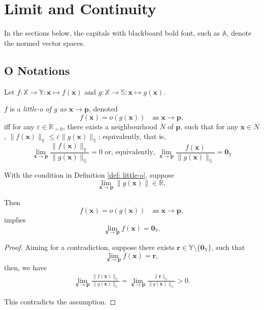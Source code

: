 


\chapter{Limit and Continuity}


In the sections below, the capitals with blackboard bold font, such as $\mathbb A$, denote the normed vector spaces.


\section{O Notations}


\begin{definition}
	\label{def: little-o}
	Let $f: \mathbb X \to \mathbb Y: \mathbf x \mapsto f(\mathbf x)$ and $g: \mathbb X \to \mathbb S: \mathbf x \mapsto g(\mathbf x)$.
	
	$f$ is a \textit{little-o of $g$ as $\mathbf x \to \mathbf p$}, denoted
	$$
	f(\mathbf x) = o(g(\mathbf x)) \quad \text{as $\mathbf x \to \mathbf p$},
	$$
	iff for any $\varepsilon \in \mathbb R_{> 0}$, there exists a neighbourhood $N$ of $\mathbf p$, such that for any $\mathbf x \in N$, $\| f(\mathbf x) \|_{\mathbb Y} \le \varepsilon \| g (\mathbf x)\|_{\mathbb S}$; equivalently, that is,
	$$
	\lim_{\mathbf x \to \mathbf p} \frac{\|f(\mathbf x)\|_{\mathbb Y}}{\| g(\mathbf x) \|_{\mathbb S}} = 0 \text{ or, equivalently, } \lim_{\mathbf x \to \mathbf p} \frac{f(\mathbf x)}{\| g(\mathbf x) \|_{\mathbb S}} = \mathbf 0_{\mathbb Y}
	$$
\end{definition}


\begin{lemma}
	\label{lm: little-o: zero limit}
	With the condition in Definition \ref{def: little-o}, suppose
	$$
	\lim_{\mathbf x \to \mathbf p} \| g(\mathbf x) \| \in \mathbb R,
	$$
	
	Then
	$$
	f(\mathbf x) = o(g(\mathbf x)) \quad \text{as $\mathbf x \to \mathbf p$},
	$$
	implies
	$$
	\lim_{\mathbf x \to \mathbf p} f(\mathbf x) = \mathbf 0_{\mathbb Y}.
	$$
	
	\begin{proof}
		Aiming for a contradiction, suppose there exists $\mathbf r \in \mathbb Y \setminus \{ \mathbf 0_{\mathbb Y} \}$, such that
		$$
		\lim_{\mathbf x \to \mathbf p} f(\mathbf x) = \mathbf r,
		$$
		then, we have
		$$
		\begin{aligned}
			\lim_{\mathbf x \to \mathbf p} \frac{\| f(\mathbf x) \|_{\mathbb Y}}{\| g(\mathbf x) \|_{\mathbb S}} = \lim_{\mathbf x \to \mathbf p} \frac{\| \mathbf r \|_{\mathbb Y}}{\| g(\mathbf x) \|_{\mathbb S}} > 0.
		\end{aligned}
		$$
		
		This contradicts the assumption.
	\end{proof}
\end{lemma}


